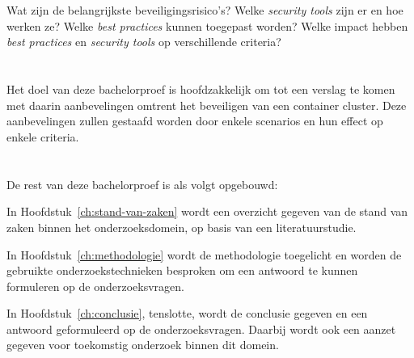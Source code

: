 \section{}
\label{sec:onderzoeksvraag}


Wat zijn de belangrijkste beveiligingsrisico's? Welke \textit{security tools} zijn er en hoe werken ze? Welke \textit{best practices} kunnen toegepast worden? Welke impact hebben \textit{best practices} en \textit{security tools} op verschillende criteria?

\section{}
\label{sec:onderzoeksdoelstelling}


Het doel van deze bachelorproef is hoofdzakkelijk om tot een verslag te komen met daarin aanbevelingen omtrent het beveiligen van een container cluster. Deze aanbevelingen zullen gestaafd worden door enkele scenarios en hun effect op enkele criteria.

\section{}
\label{sec:opzet-bachelorproef}


De rest van deze bachelorproef is als volgt opgebouwd:

In Hoofdstuk~\ref{ch:stand-van-zaken} wordt een overzicht gegeven van de stand van zaken binnen het onderzoeksdomein, op basis van een literatuurstudie.

In Hoofdstuk~\ref{ch:methodologie} wordt de methodologie toegelicht en worden de gebruikte onderzoekstechnieken besproken om een antwoord te kunnen formuleren op de onderzoeksvragen.


In Hoofdstuk~\ref{ch:conclusie}, tenslotte, wordt de conclusie gegeven en een antwoord geformuleerd op de onderzoeksvragen. Daarbij wordt ook een aanzet gegeven voor toekomstig onderzoek binnen dit domein.
